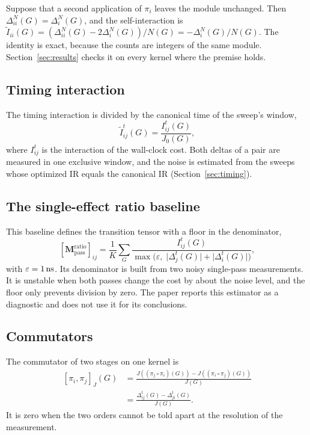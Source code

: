 \begin{remark}
\label{rem:identity}
Suppose that a second application of $\pi_i$ leaves the module unchanged. Then $\Delta^N_{ii}(G)=\Delta^N_i(G)$, and the
self-interaction is $\tilde I_{ii}(G)=(\Delta^N_{ii}(G)-2\Delta^N_i(G))/N(G)=-\Delta^N_i(G)/N(G)$. The identity is exact,
because the counts are integers of the same module. Section~\ref{sec:results} checks it on every kernel where the premise
holds.
\end{remark}

\subsection{Timing interaction}

The timing interaction is divided by the canonical time of the sweep's window,
\begin{equation}\label{eq:timing}
  \tilde I^t_{ij}(G)=\frac{I^t_{ij}(G)}{J_0(G)},
\end{equation}
where $I^t_{ij}$ is the interaction of the wall-clock cost. Both deltas of a pair are measured in one exclusive window, and the
noise is estimated from the sweeps whose optimized IR equals the canonical IR (Section~\ref{sec:timing}).

\subsection{The single-effect ratio baseline}

This baseline defines the transition tensor with a floor in the denominator,
\begin{equation}\label{eq:ratio}
  [\mathbf{M}^{\mathrm{ratio}}_{\mathrm{pass}}]_{ij}=\frac{1}{K}\sum_{G}\frac{I^t_{ij}(G)}{\max\bigl(\varepsilon,\;\lvert\Delta^t_j(G)\rvert+\lvert\Delta^t_i(G)\rvert\bigr)},
\end{equation}
with $\varepsilon=1{}\,\mathrm{ns}$. Its denominator is built from two noisy single-pass measurements. It is
unstable when both passes change the cost by about the noise level, and the floor only prevents division by zero. The paper
reports this estimator as a diagnostic and does not use it for its conclusions.

\subsection{Commutators}

The commutator of two stages on one kernel is
\begin{equation}\label{eq:commutator}
\begin{split}
  [\pi_i,\pi_j]_J(G)&=\frac{J((\pi_j\circ\pi_i)(G))-J((\pi_i\circ\pi_j)(G))}{J(G)}\\
  &=\frac{\Delta^t_{ij}(G)-\Delta^t_{ji}(G)}{J(G)}.
\end{split}
\end{equation}
It is zero when the two orders cannot be told apart at the resolution of the measurement.

